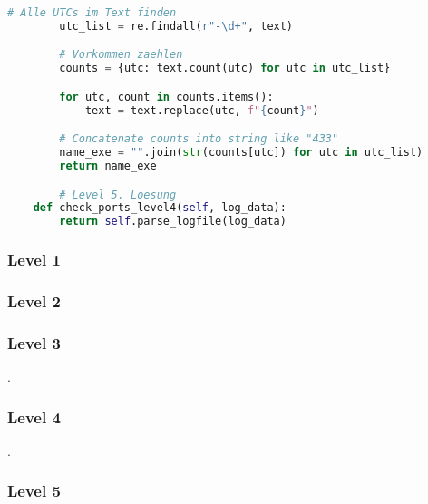 \documentclass[a4paper 11pt]{article}
\begin{document}
\begin{lstlisting}[language=python, caption=der Raum]
        # Alle UTCs im Text finden
        utc_list = re.findall(r"-\d+", text)

        # Vorkommen zaehlen
        counts = {utc: text.count(utc) for utc in utc_list}

        for utc, count in counts.items():
            text = text.replace(utc, f"{count}")

        # Concatenate counts into string like "433"
        name_exe = "".join(str(counts[utc]) for utc in utc_list)
        return name_exe

		# Level 5. Loesung
    def check_ports_level4(self, log_data):
        return self.parse_logfile(log_data)

\end{lstlisting}
\flushleft



\subsubsection{Level 1}

 

\subsubsection{Level 2}



\subsubsection{Level 3}

. 

\subsubsection{Level 4}

.

\subsubsection{Level 5}
\end{document}
